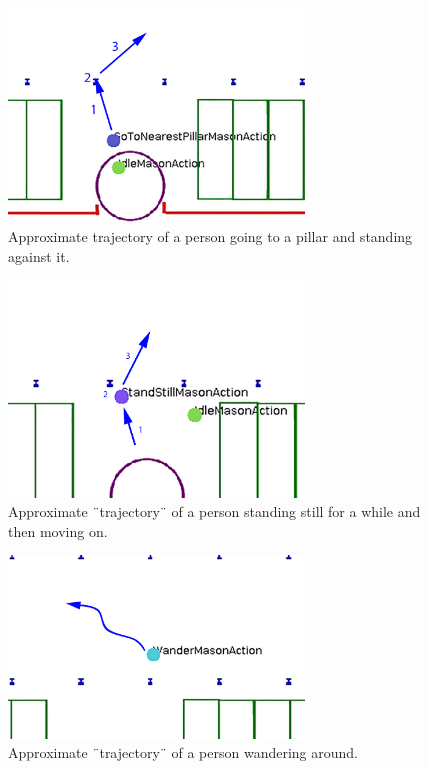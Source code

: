 \documentclass[11pt, a4paper]{book}
\begin{document}
\begin{figure}[h!]
\centering
\includegraphics[width=0.7\textwidth]{"./qualitative experiment pictures/simulated_pillarsituation_cropped"}
\caption{Approximate trajectory of a person going to a pillar and standing against it.}
\label{fig:simulatedpillartrajectory}
\end{figure}
\begin{figure}[h!]
\centering
\includegraphics[width=0.7\textwidth]{"./qualitative experiment pictures/simulated_standstillsituation_cropped"}
\caption{Approximate ¨trajectory¨ of a person standing still for a while and then moving on.}
\label{fig:simulatedstandstilltrajectory}
\end{figure}
\begin{figure}[h!]
\centering
\includegraphics[width=0.7\textwidth]{"./qualitative experiment pictures/simulated_wander_cropped"}
\caption{Approximate ¨trajectory¨ of a person wandering around.}
\label{fig:simulatedwandertrajectory}
\end{figure}
\clearpage
\end{document}
